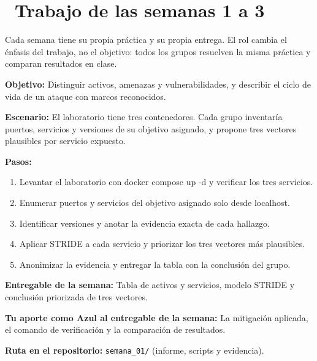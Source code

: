 \documentclass[11pt,a4paper]{article}
\newcommand{\iconotexto}[2]{\textcolor{cyanNeon}{\faIcon{#1}}~#2}
\begin{document}
\section{\iconotexto{calendar-alt}{Trabajo de las semanas 1 a 3}}

Cada semana tiene su propia práctica y su propia entrega. El rol cambia el énfasis del trabajo, no el objetivo: todos los grupos resuelven la misma práctica y comparan resultados en clase.

\begin{tcolorbox}[cajaContenido,title={Semana 1 --- Inventario de superficie de ataque del laboratorio}]
\textbf{Objetivo:} Distinguir activos, amenazas y vulnerabilidades, y describir el ciclo de vida de un ataque con marcos reconocidos.

\textbf{Escenario:} El laboratorio tiene tres contenedores. Cada grupo inventaría puertos, servicios y versiones de su objetivo asignado, y propone tres vectores plausibles por servicio expuesto.


\textbf{Pasos:}
\begin{enumerate}[leftmargin=1.4em,itemsep=2pt,topsep=3pt]
  \item Levantar el laboratorio con docker compose up -d y verificar los tres servicios.
  \item Enumerar puertos y servicios del objetivo asignado solo desde localhost.
  \item Identificar versiones y anotar la evidencia exacta de cada hallazgo.
  \item Aplicar STRIDE a cada servicio y priorizar los tres vectores más plausibles.
  \item Anonimizar la evidencia y entregar la tabla con la conclusión del grupo.
\end{enumerate}
\textbf{Entregable de la semana:} Tabla de activos y servicios, modelo STRIDE y conclusión priorizada de tres vectores.

\textbf{Tu aporte como Azul al entregable de la semana:} La mitigación aplicada, el comando de verificación y la comparación de resultados.

\textbf{Ruta en el repositorio:} \texttt{semana\_01/} (informe, scripts y evidencia).
\end{tcolorbox}
\end{document}
